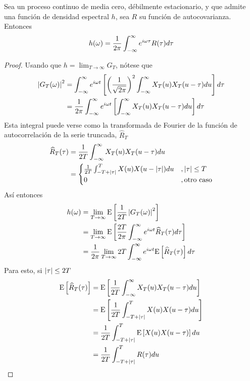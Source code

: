 \begin{teorema}
Sea \xt un proceso continuo de media cero, débilmente estacionario, y que admite una función de densidad espectral $h$, sea $R$ su función de autocovarianza. Entonces
\begin{equation}
h(\omega) = \frac{1}{2\pi} \int_{-\infty}^{\infty} e^{i \omega \tau} R(\tau) d\tau
\end{equation}
\label{teo:corr_four}
\end{teorema}
\begin{proof}
Usando que $h = \lim_{T\rightarrow\infty} G_T$, nótese que
\begin{align*}
\left| G_T(\omega) \right|^{2} &= 
\int_{-\infty}^{\infty} e^{i \omega t} \left[ \left(\frac{1}{\sqrt{2\pi}} \right)^{2} \int_{-\infty}^{\infty} X_T(u) X_T(u-\tau) du \right] d\tau \\
&=
\frac{1}{2\pi} \int_{-\infty}^{\infty} e^{i \omega t} \left[ \int_{-\infty}^{\infty} X_T(u) X_T(u-\tau) du \right] d\tau \\
\end{align*}
Esta integral puede verse como la transformada de Fourier de la función de autocorrelación de la serie truncada, $\widehat{R}_T$
\begin{align*}
\widehat{R}_T (\tau) &= \frac{1}{2T} \int_{-\infty}^{\infty} X_T(u) X_T(u-\tau) du \\
&= \begin{cases}
\frac{1}{2T} \int_{-T+\left| \tau \right|}^{T} X(u) X(u-\left| \tau \right|) du &, \left| \tau \right| \leq T \\
0 &, \text{otro caso}
\end{cases}
\end{align*}
Así entonces
\begin{align*}
h(\omega) &=
\lim_{T\rightarrow \infty} \mathrm{E}\left[ \frac{1}{2T} \left| G_T(\omega) \right|^{2} \right] \\
&=
\lim_{T\rightarrow \infty}
\mathrm{E}\left[ \frac{2T}{2\pi} \int_{-\infty}^{\infty} e^{i \omega t} \widehat{R}_T(\tau) d\tau  \right]\\
&=
\frac{1}{2\pi}
\lim_{T\rightarrow \infty}
2T \int_{-\infty}^{\infty} e^{i \omega t} \mathrm{E}\left[ \widehat{R}_T(\tau) \right] d\tau\\
\end{align*}
Para esto, si $\left| \tau \right| \leq 2T$
\begin{align*}
\E{\widehat{R}_T(\tau)} &=
\E{\frac{1}{2T} \intR X_T(u) X_T(u-\tau) du} \\
&=
\E{ \frac{1}{2T} \int_{-T+\abso{\tau}}^{T} X(u) X(u-\tau) du } \\
&=
\frac{1}{2T} \int_{-T+\abso{\tau}}^{T} \E{X(u) X(u-\tau)} du \\
&=
\frac{1}{2T} \int_{-T+\abso{\tau}}^{T} R(\tau) du \\

\end{align*}
\end{proof}
